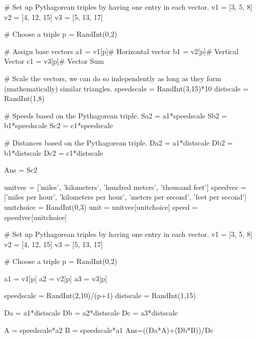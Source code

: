 \begin{sagesilent}

# Set up Pythagorean triples by having one entry in each vector.
v1 = [3, 5, 8]
v2 = [4, 12, 15]
v3 = [5, 13, 17]

# Choose a triple
p = RandInt(0,2)

# Assign base vectors
a1 = v1[p]# Horizontal vector
b1 = v2[p]# Vertical Vector
c1 = v3[p]# Vector Sum

# Scale the vectors, we can do so independently as long as they form (mathematically) similar triangles.
speedscale = RandInt(3,15)*10
distscale = RandInt(1,8)

# Speeds based on the Pythagorean triple.
Sa2 = a1*speedscale
Sb2 = b1*speedscale
Sc2 = c1*speedscale

# Distances based on the Pythagorean triple.
Da2 = a1*distscale
Db2 = b1*distscale
Dc2 = c1*distscale

Ans = Sc2
\end{sagesilent}



\begin{sagesilent}
unitvec = ['miles', 'kilometers', 'hundred meters', 'thousand feet']
speedvec = ['miles per hour', 'kilometers per hour', 'meters per second', 'feet per second']
unitchoice = RandInt(0,3)
unit = unitvec[unitchoice]
speed = speedvec[unitchoice]

# Set up Pythagorean triples by having one entry in each vector.
v1 = [3, 5, 8]
v2 = [4, 12, 15]
v3 = [5, 13, 17]

# Choose a triple
p = RandInt(0,2)

a1 = v1[p]
a2 = v2[p]
a3 = v3[p]

speedscale = RandInt(2,10)/(p+1)
distscale = RandInt(1,15)

Da = a1*distscale
Db = a2*distscale
Dc = a3*distscale

A = speedscale*a2
B = speedscale*a1
Ans=((Da*A)+(Db*B))/Dc

\end{sagesilent}

